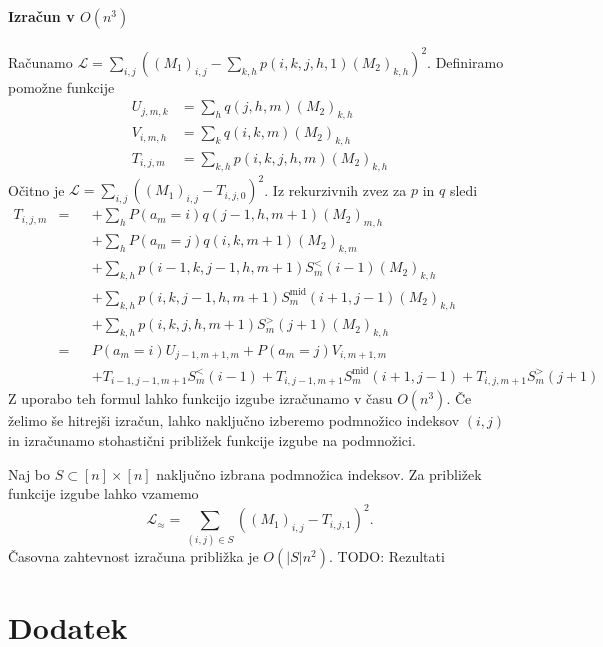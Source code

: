 \documentclass[mat2, tisk]{fmfdelo}
\newcommand{\TODO}[1]{{\color{blue} TODO: #1}}
\newcommand{\loss }{\mathcal L}
\begin{document}
            \paragraph{Izračun v $O(n^3)$}
            Računamo
            $\loss = \sum_{i,j} \left ((M_1)_{i,j} - \sum_{k,h}p(i, k, j,
            h, 1) (M_2)_{k,h} \right )^2$. 
            Definiramo pomožne funkcije
            \begin{align*}
              U_{j, m, k} &= \sum_h q(j, h, m)(M_2)_{k, h} \\
              V_{i, m, h} &= \sum_k q(i, k, m)(M_2)_{k, h} \\
              T_{i, j, m} &= \sum_{k,h} p(i, k, j, h, m) (M_2)_{k,h}
            \end{align*}
            Očitno je $\loss = \sum_{i,j} \left ((M_1)_{i,j} - T_{i,
            j, 0} \right )^2$. Iz rekurzivnih zvez za $p$ in $q$ 
            sledi 
            \begin{align*}
T_{i, j, m} &={} &
   &+\sum_h  P(a_m = i) q(j-1, h, m+1) (M_2)_{m,h}  \\
          &   & 
   &+\sum_h  P(a_m = j) q(i, k, m+1) (M_2)_{k,m} \\
          &   &
  &+ \sum_{k, h}  
      p(i-1, k, j-1, h, m+1) S_m^<(i-1) (M_2)_{k,h} \\
          &   &
   &+\sum_{k, h}   
      p(i, k, j-1, h, m+1) S_m^{\text{mid}}(i+1, j-1)(M_2)_{k,h} \\ 
          &   &
   &+\sum_{k, h}  
      p(i, k, j, h, m+1) S_m^>(j+1) (M_2)_{k,h} \\
   &={} &
   &P(a_m=i)  U_{j-1, m+1, m} +
   P(a_m=j) V_{i, m+1, m} \\
   & & &+  
   T_{i-1, j-1, m+1}  S_m^<(i-1) +
   T_{i, j-1, m+1}  S_m^{\text{mid}}(i+1, j-1) +
   T_{i, j, m+1}  S_m^>(j+1)
\end{align*}
Z uporabo teh formul lahko funkcijo izgube izračunamo v
času $O(n^3)$. Če želimo še hitrejši izračun, lahko 
naključno izberemo podmnožico indeksov $(i,j)$ in
izračunamo stohastični približek funkcije izgube na podmnožici.

Naj bo $S \subset [n] \times [n]$ naključno izbrana
podmnožica indeksov. Za približek funkcije izgube lahko
vzamemo
\begin{equation*}
  \loss_\approx = \sum_{(i, j) \in S}
  \left ((M_1)_{i,j} - T_{i, j, 1} \right )^2.
\end{equation*}
Časovna zahtevnost izračuna približka je
$O(|S| n^2)$.
%
\TODO{Rezultati}
            \section{Dodatek}
\end{document}
